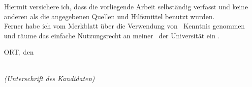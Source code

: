 \documentclass[../main]{subfiles}
\begin{document}
\newpage

\thispagestyle{empty}

\begin{large}

\vspace*{2cm}

\noindent
Hiermit versichere ich, dass die vorliegende Arbeit selbständig verfasst und keine anderen als die angegebenen Quellen und Hilfsmittel benutzt wurden.\\[1em]

\noindent
Ferner habe ich vom Merkblatt über die Verwendung von \Darbeit \ Kenntnis genommen und räume das einfache Nutzungsrecht an meiner \Darbeit \ der  Universität %
ein%
.

\vspace{2cm}

\noindent
ORT, den \Dday

\vspace{3cm}

\hspace*{7cm}%
\dotfill\\
\hspace*{8.5cm}%
\textit{(Unterschrift des Kandidaten)}

\end{large}
\end{document}
